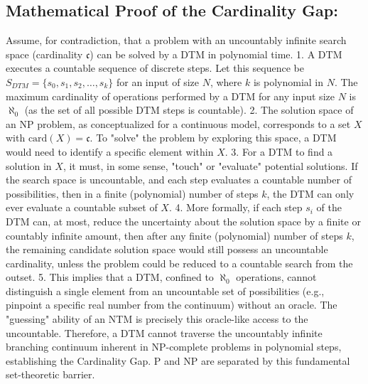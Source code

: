 \documentclass[11pt,twocolumn]{article}
\begin{document}
\subsection{Mathematical Proof of the Cardinality Gap:}
Assume, for contradiction, that a problem with an uncountably infinite search space (cardinality $\mathfrak{c}$) can be solved by a DTM in polynomial time.
1.  A DTM executes a countable sequence of discrete steps. Let this sequence be $S_{DTM} = \{s_0, s_1, s_2, \dots, s_k\}$ for an input of size $N$, where $k$ is polynomial in $N$. The maximum cardinality of operations performed by a DTM for any input size $N$ is $\aleph_0$ (as the set of all possible DTM steps is countable).
2.  The solution space of an NP problem, as conceptualized for a continuous model, corresponds to a set $X$ with $\text{card}(X) = \mathfrak{c}$. To "solve" the problem by exploring this space, a DTM would need to identify a specific element within $X$.
3.  For a DTM to find a solution in $X$, it must, in some sense, "touch" or "evaluate" potential solutions. If the search space is uncountable, and each step evaluates a countable number of possibilities, then in a finite (polynomial) number of steps $k$, the DTM can only ever evaluate a countable subset of $X$.
4.  More formally, if each step $s_i$ of the DTM can, at most, reduce the uncertainty about the solution space by a finite or countably infinite amount, then after any finite (polynomial) number of steps $k$, the remaining candidate solution space would still possess an uncountable cardinality, unless the problem could be reduced to a countable search from the outset.
5.  This implies that a DTM, confined to $\aleph_0$ operations, cannot distinguish a single element from an uncountable set of possibilities (e.g., pinpoint a specific real number from the continuum) without an oracle. The "guessing" ability of an NTM is precisely this oracle-like access to the uncountable.
Therefore, a DTM cannot traverse the uncountably infinite branching continuum inherent in NP-complete problems in polynomial steps, establishing the Cardinality Gap. P and NP are separated by this fundamental set-theoretic barrier.
\end{document}
